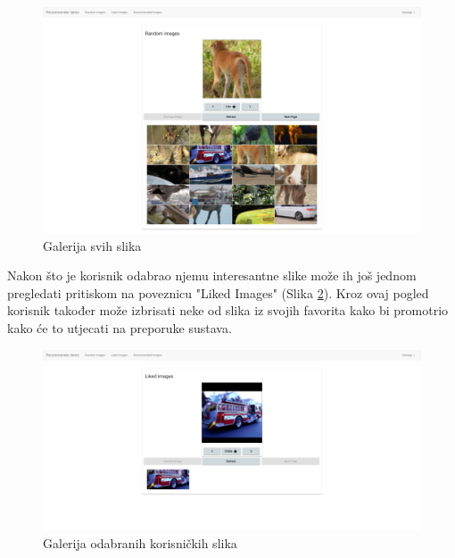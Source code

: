 \documentclass[times, utf8, proizvoljni, numeric]{fer}
\begin{document}
\begin{figure}[!ht]
	\begin{center}
		\captionsetup{justification=centering}
		\includegraphics[width=1.0\textwidth]{./imgs/demo-preporucitelja-po-sadrzaju/tijek-rada/demo-rand.png}
		\caption{Galerija svih slika}
		\label{fg:demo_rand}
	\end{center}
\end{figure}


Nakon što je korisnik odabrao njemu interesantne slike može ih još jednom pregledati pritiskom na poveznicu "Liked Images" (Slika \ref{fg:demo_liked}). Kroz ovaj pogled korisnik također može izbrisati neke od slika iz svojih favorita kako bi promotrio kako će to utjecati na preporuke sustava.

\begin{figure}[H]
	\begin{center}
		\captionsetup{justification=centering}
		\includegraphics[width=1.0\textwidth]{./imgs/demo-preporucitelja-po-sadrzaju/tijek-rada/demo-liked.png}
		\caption{Galerija odabranih korisničkih slika}
		\label{fg:demo_liked}
	\end{center}
\end{figure}
\end{document}

